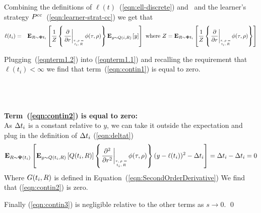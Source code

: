 \documentclass{article}[12pt]
\begin{document}
Combining the definitions of $\ell(t)$~(\ref{eqn:ell-discrete}) and~
and the learner's strategy
$P^{cc}$~(\ref{eqn:learner-strat-cc}) we get that
\begin{eqnarray}
\ell(t_i) &=& \E{\R \sim \state{t_i}}{\frac{1}{Z}
              \at{\frac{\partial}{\partial r}}
              \E{y \sim \adversM(i,\R)}{y}} \mbox{ where }
              Z=\E{\R \sim \state{t_i}}{\frac{1}{Z}
              \at{\frac{\partial}{\partial r}}}
              \label{eqnterm1.2}
\end{eqnarray}

Plugging~(\ref{eqnterm1.2}) into (\ref{eqnterm1.1}) and recalling the
requirement that $\ell(t_i)<\infty$ we find that
term~(\ref{eqn:contin1}) is equal to zero.


~\\~\\~\\
{\bf Term~(\ref{eqn:contin2}) is equal to zero:}\\
As $\Delta t_i$ is a constant relative to $y$, we can take it
outside the expectation and plug in the definition of $\Delta t_i$ (\ref{eqn:deltat})
\begin{equation} \label{eqn:term2.1}
  \E{\R \sim \state(t_i)}{\E{y \sim
      \adversM(t_i,\R)}{\adversM(t_i,\R)}{\at{\frac{\partial^2}{\partial r^2}}
      (y-\ell(t_i))^2} - \deltat_i}=
  \deltat_i - \deltat_i =0
\end{equation}
Where $G(t_i,R)$ is defined in Equation~(\ref{eqn:SecondOrderDerivative})
We find that (\ref{eqn:contin2}) is zero.

Finally (\ref{eqn:contin3}) is negligible relative to the other terms
as $s \to 0$.
\qed 
\end{document}
